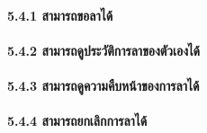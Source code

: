 \hspace{2.5cm}\paragraph{5.4.1 สามารถขอลาได้}

\hspace{2.5cm}\paragraph{5.4.2 สามารถดูประวัติการลาของตัวเองได้}

\hspace{2.5cm}\paragraph{5.4.3 สามารถดูความคืบหน้าของการลาได้}

\hspace{2.5cm}\paragraph{5.4.4 สามารถยกเลิกการลาได้}

\vspace{0cm}

